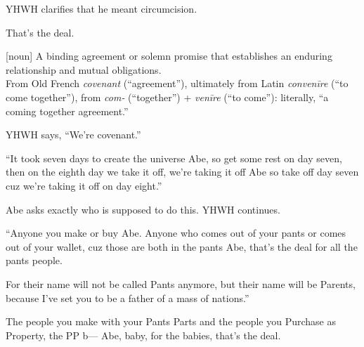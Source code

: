{
}
{
}
{
	YHWH clarifies that he meant circumcision.
	
	That's the deal.

	[noun]{
	A binding agreement or solemn promise that establishes an enduring
	relationship and mutual obligations.\\
	From Old French \textsl{covenant} (``agreement''), ultimately from Latin
	\textsl{convenīre} (``to come together''), from \textsl{com-} (``together'')
	+ \textsl{venīre} (``to come''): literally, ``a coming together agreement.''
	}

	YHWH says, ``We're covenant.''

}

{
}
{
}
{
	``It took seven days to create the universe Abe, so get some rest
	on day seven, then on the eighth day we take it off, we're taking
	it off Abe so take off day seven cuz we're taking it off on day
	eight.''

	Abe asks exactly who is supposed to do this. YHWH continues.

	``Anyone you make or buy Abe. Anyone who comes out of your
	pants or comes out of your wallet, cuz those are both in
	the pants Abe, that's the deal for all the pants people.

	For their name will not be called Pants anymore, but their
	name will be Parents, because I’ve set you to be a father
	of a mass of nations.''

}

{
}
{
}
{
	The people you make with your Pants Parts and the people
	you Purchase as Property, the PP b--- Abe, baby, for
	the babies, that's the deal.
}

